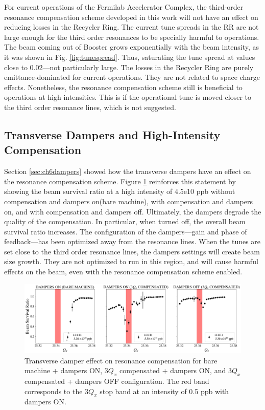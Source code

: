 For current operations of the Fermilab Accelerator Complex, the third-order resonance compensation scheme developed in this work will not have an effect on reducing losses in the Recycler Ring. The current tune spreads in the RR are not large enough for the third order resonances to be specially harmful to operations. The beam coming out of Booster grows exponentially with the beam intensity, as it was shown in Fig. \ref{fig:tunespread}. Thus, saturating the tune spread at values close to 0.02---not particularly large. The losses in the Recycler Ring are purely emittance-dominated for current operations. They are not related to space charge effects. Nonetheless, the resonance compensation scheme still is beneficial to operations at high intensities. This is if the operational tune is moved closer to the third order resonance lines, which is not suggested.  

\subsection{Transverse Dampers and High-Intensity Compensation}

Section \ref{sec:ch6dampers} showed how the transverse dampers have an effect on the resonance compensation scheme. Figure \ref{fig:dampers7} reinforces this statement by showing the beam survival ratio at a high intensity of 4.5e10 ppb without compensation and dampers on(bare machine), with compensation and dampers on, and with compensation and dampers off. Ultimately, the dampers degrade the quality of the compensation. In particular, when turned off, the overall beam survival ratio increases. The configuration of the dampers---gain and phase of feedback---has been optimized away from the resonance lines. When the tunes are set close to the third order resonance lines, the dampers settings will create beam size growth. They are not optimized to run in this region, and will cause harmful effects on the beam, even with the resonance compensation scheme enabled.

\begin{figure}[H]
    \centering
    \includegraphics[width=\columnwidth]{chapter7/dampers_config.png}
    \caption{Transverse damper effect on resonance compensation for bare machine + dampers ON, $3Q_x$ compensated + dampers ON, and $3Q_x$ compensated + dampers OFF configuration. The red band corresponds to the $3Q_x$ stop band at an intensity of 0.5 ppb with dampers ON.}
    \label{fig:dampers7}
\end{figure}

